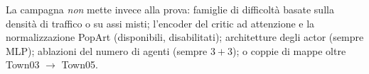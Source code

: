 La campagna \emph{non} mette invece alla prova: famiglie di difficoltà
basate sulla densità di traffico o su assi misti; l'encoder del critic ad
attenzione e la normalizzazione PopArt (disponibili, disabilitati);
architetture degli actor (sempre MLP); ablazioni del numero di agenti
(sempre $3+3$); o coppie di mappe oltre Town03 $\to$ Town05.
